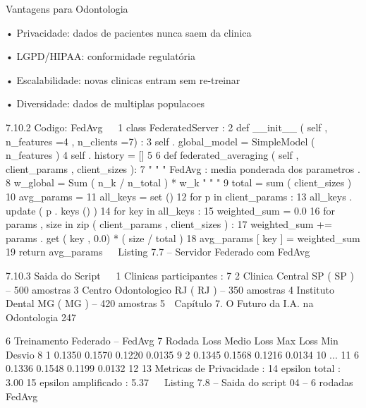          Vantagens para Odontologia

             • Privacidade: dados de pacientes nunca saem da clinica

             • LGPD/HIPAA: conformidade regulatória

             • Escalabilidade: novas clinicas entram sem re-treinar

             • Diversidade: dados de multiplas populacoes


     7.10.2      Codigo: FedAvg
                                                                                           
 1 class FederatedServer :
 2     def __init__ ( self , n_features =4 , n_clients =7) :
 3         self . global_model = SimpleModel ( n_features )
 4         self . history = []
 5
 6     def federated_averaging ( self , client_params , client_sizes ):
 7         " " " FedAvg : media ponderada dos parametros .
 8         w_global = Sum ( n_k / n_total ) * w_k " " "
 9         total = sum ( client_sizes )
10         avg_params = {}
11         all_keys = set ()
12         for p in client_params :
13                all_keys . update ( p . keys () )
14         for key in all_keys :
15                weighted_sum = 0.0
16                for params , size in zip ( client_params , client_sizes ) :
17                    weighted_sum += params . get ( key , 0.0) * ( size / total )
18                avg_params [ key ] = weighted_sum
19         return avg_params
                                                                                           
                            Listing 7.7 – Servidor Federado com FedAvg


     7.10.3      Saida do Script
                                                                                           
 1       Clinicas participantes : 7
 2         Clinica Central SP ( SP ) -- 500 amostras
 3         Centro Odontologico RJ ( RJ ) -- 350 amostras
 4         Instituto Dental MG ( MG ) -- 420 amostras
 5
     Capítulo 7. O Futuro da I.A. na Odontologia                                    247


 6       Treinamento Federado -- FedAvg
 7       Rodada Loss Medio   Loss Max   Loss Min       Desvio
 8            1     0.1350     0.1570     0.1220       0.0135
 9            2     0.1345     0.1568     0.1216       0.0134
10            ...
11            6     0.1336     0.1548     0.1199       0.0132
12
13       Metricas de Privacidade :
14         epsilon total : 3.00
15         epsilon amplificado : 5.37
                                                                                          
                        Listing 7.8 – Saida do script 04 – 6 rodadas FedAvg


